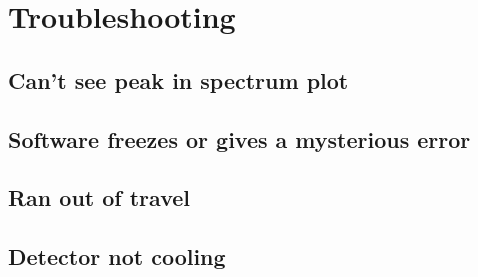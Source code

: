 \chapter{Troubleshooting}

\section{Can't see peak in spectrum plot}

\section{Software freezes or gives a mysterious error}

\section{Ran out of travel}

\section{Detector not cooling}
